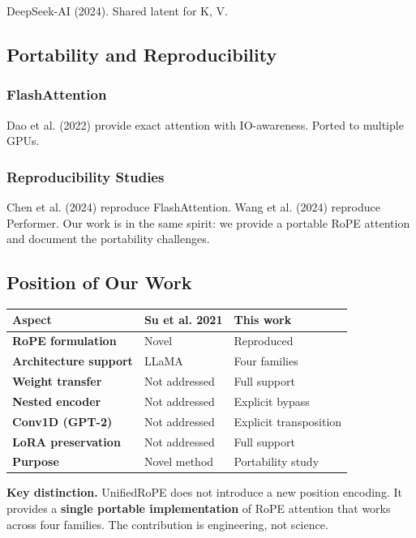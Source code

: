 {DeepSeek-AI (2024). Shared latent for K, V.

\subsection{Portability and Reproducibility}

\subsubsection{FlashAttention}

Dao et al. (2022) provide exact attention with IO-awareness. Ported to 
multiple GPUs.

\subsubsection{Reproducibility Studies}

Chen et al. (2024) reproduce FlashAttention. Wang et al. (2024) reproduce 
Performer. Our work is in the same spirit: we provide a portable RoPE 
attention and document the portability challenges.

\subsection{Position of Our Work}

\begin{table}[H]
\centering
\small
\begin{tabular}{lll}
\toprule
\textbf{Aspect} & \textbf{Su et al. 2021} & \textbf{This work} \\
\midrule
\textbf{RoPE formulation} & Novel & Reproduced \\
\textbf{Architecture support} & LLaMA & Four families \\
\textbf{Weight transfer} & Not addressed & Full support \\
\textbf{Nested encoder} & Not addressed & Explicit bypass \\
\textbf{Conv1D (GPT-2)} & Not addressed & Explicit transposition \\
\textbf{LoRA preservation} & Not addressed & Full support \\
\textbf{Purpose} & Novel method & Portability study \\
\bottomrule
\end{tabular}
\end{table}

\textbf{Key distinction.} UnifiedRoPE does not introduce a new position encoding. 
It provides a \textbf{single portable implementation} of RoPE attention that 
works across four families. The contribution is engineering, not science.
\begin{lstlisting}


\end{lstlisting}}
